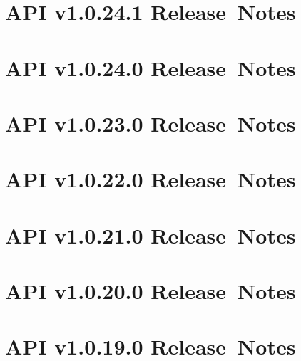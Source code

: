 \documentclass{memoir}%
\begin{document}
%
\section*{API v1.0.24.1 Release~Notes}%
\paragraph*{}%

%
\section*{API v1.0.24.0 Release~Notes}%
\paragraph*{}%

%
\section*{API v1.0.23.0 Release~Notes}%
\paragraph*{}%

%
\section*{API v1.0.22.0 Release~Notes}%
\paragraph*{}%

%
\section*{API v1.0.21.0 Release~Notes}%
\paragraph*{}%

%
\section*{API v1.0.20.0 Release~Notes}%
\paragraph*{}%

%
\section*{API v1.0.19.0 Release~Notes}%
\end{document}
